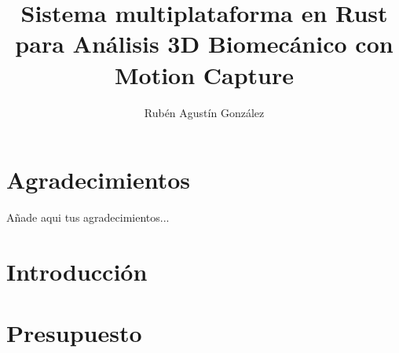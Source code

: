 
\newcommand{\pfg}{Proyecto Fin de Grado }

\title{Sistema multiplataforma en Rust para Análisis 3D 
Biomecánico con Motion Capture}
\author{Rubén Agustín González}



\hypersetup{pageanchor=false}
\begin{titlepage}
    \thispagestyle{empty}
    
\end{titlepage}

\listoftodos

\newpage
\begin{abstract}
    
\end{abstract}
\renewcommand{\abstractname}{Abstract} %
\newpage
\vspace{10cm}
\begin{abstract}
    
\end{abstract}

\chapter*{Agradecimientos}
\noindent Añade aqui tus agradecimientos...

\listoffigures


\hypersetup{pageanchor=false}
\hypersetup{linkcolor=black}
\tableofcontents


\chapter{Introducción}
\label{sec:cap1}





\chapter{Presupuesto}
\label{sec:cap4}


